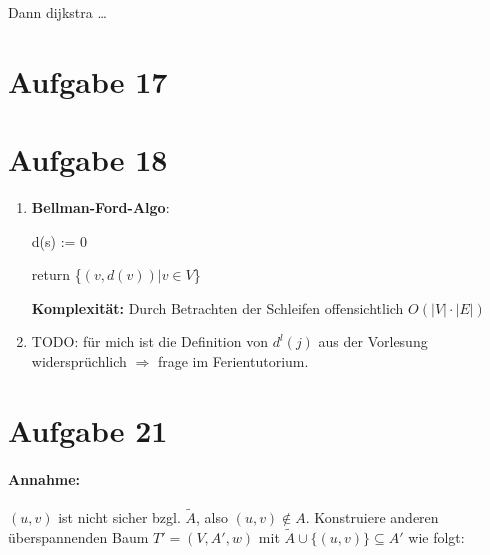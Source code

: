 \documentclass[10pt,a4paper]{article}
\begin{document}
    Dann dijkstra \ldots

\section*{Aufgabe 17}


    
\section*{Aufgabe 18}

    \begin{enumerate}[label={\alph*)}]
        \item 

            \textbf{Bellman-Ford-Algo}: \\
            \begin{algorithm}[H]
            d(s) := 0 \;
            
            return \{$(v,d(v)) | v \in V$\} \;
            \end{algorithm}
            
            \textbf{Komplexität:} Durch Betrachten der Schleifen offensichtlich  $O(|V| \cdot |E|)$            
            
        \item
            TODO: für mich ist die Definition von $d^l(j)$ aus der Vorlesung widersprüchlich
                $\Rightarrow $ frage im Ferientutorium.
            

    \end{enumerate}
    
    
    

\section*{Aufgabe 21}
	\paragraph{Annahme:} $(u,v)$ ist nicht sicher bzgl. $\tilde{A}$, also $(u, v) \notin A$.
	Konstruiere anderen überspannenden Baum $T' = (V, A', w)$ mit $\tilde{A} \cup \{(u,v)\} \subseteq A'$ wie folgt:
\end{document}
